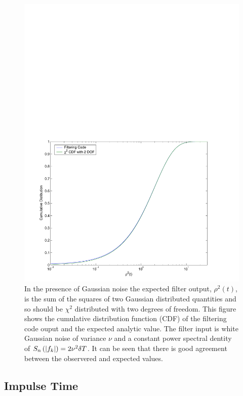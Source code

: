 \begin{figure}[htb]
\label{f:rhosq_gaussian_cdf}
\begin{center}
\includegraphics[width=\linewidth]{figures/findchirp/rhosq_gaussian_cdf}
\end{center}
\caption{%
In the presence of Gaussian noise the expected filter output, $\rho^2(t)$, is
the sum of the squares of two Gaussian distributed quantities and so should be
$\chi^2$ distributed with two degrees of freedom. This figure shows the
cumulative distribution function (CDF) of the filtering code ouput and the
expected analytic value. The filter input is white Gaussian noise of variance
$\nu$ and a constant power spectral dentity of $S_n\left(\left|f_{k}\right|\right) = 2\nu^2\delta T$. It
can be seen that there is good agreement between the observered and expected
values.
}
\end{figure}

\subsection{Impulse Time}
\label{ss:impulsetime}

